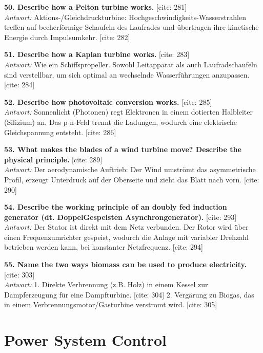 \documentclass[11pt,a4paper]{article}
\begin{document}
\vspace{0.5cm}
\textbf{50. Describe how a Pelton turbine works.} [cite: 281]\\
\textit{Antwort:} Aktions-/Gleichdruckturbine: Hochgeschwindigkeits-Wasserstrahlen treffen auf becherförmige Schaufeln des Laufrades und übertragen ihre kinetische Energie durch Impulsumkehr. [cite: 282]

\vspace{0.5cm}
\textbf{51. Describe how a Kaplan turbine works.} [cite: 283]\\
\textit{Antwort:} Wie ein Schiffspropeller. Sowohl Leitapparat als auch Laufradschaufeln sind verstellbar, um sich optimal an wechselnde Wasserführungen anzupassen. [cite: 284]

\vspace{0.5cm}
\textbf{52. Describe how photovoltaic conversion works.} [cite: 285]\\
\textit{Antwort:} Sonnenlicht (Photonen) regt Elektronen in einem dotierten Halbleiter (Silizium) an. Das p-n-Feld trennt die Ladungen, wodurch eine elektrische Gleichspannung entsteht. [cite: 286]

\vspace{0.5cm}
\textbf{53. What makes the blades of a wind turbine move? Describe the physical principle.} [cite: 289]\\
\textit{Antwort:} Der aerodynamische Auftrieb: Der Wind umströmt das asymmetrische Profil, erzeugt Unterdruck auf der Oberseite und zieht das Blatt nach vorn. [cite: 290]

\vspace{0.5cm}
\textbf{54. Describe the working principle of an doubly fed induction generator (dt. DoppelGespeisten Asynchrongenerator).} [cite: 293]\\
\textit{Antwort:} Der Stator ist direkt mit dem Netz verbunden. Der Rotor wird über einen Frequenzumrichter gespeist, wodurch die Anlage mit variabler Drehzahl betrieben werden kann, bei konstanter Netzfrequenz. [cite: 294]

\vspace{0.5cm}
\textbf{55. Name the two ways biomass can be used to produce electricity.} [cite: 303]\\
\textit{Antwort:} 1. Direkte Verbrennung (z.B. Holz) in einem Kessel zur Dampferzeugung für eine Dampfturbine. [cite: 304] 2. Vergärung zu Biogas, das in einem Verbrennungsmotor/Gasturbine verstromt wird. [cite: 305]

\section*{Power System Control}
\end{document}

